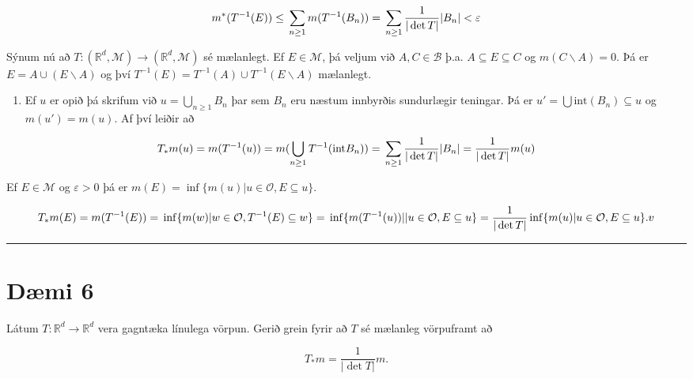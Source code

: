 \documentclass[]{book}
\providecommand{\tightlist}{%
  \setlength{\itemsep}{0pt}\setlength{\parskip}{0pt}}
\begin{document}
\[
m^*(T^{-1}(E)) \leq \\
\sum_{n\geq1} m(T^{-1}(B_n)) = \\
\sum_{n\geq1} \frac{1}{|\det T|}|B_n| < \varepsilon
\]

Sýnum nú að \(T:(\mathbb R^d,\mathcal M)\rightarrow (\mathbb R^d,\mathcal M)\) sé mælanlegt. Ef \(E \in\mathcal M\), þá veljum við \(A,C\in\mathcal B\) þ.a. \(A\subseteq E\subseteq C\) og \(m(C\backslash A) = 0\). Þá er \(E = A \cup (E\backslash A)\) og því \(T^{-1}(E) = T^{-1}(A) \cup T^{-1}(E\backslash A)\) mælanlegt.

\begin{enumerate}
\def\labelenumi{\arabic{enumi}.}
\setcounter{enumi}{3}
\tightlist
\item
  Ef \(u\) er opið þá skrifum við \(u = \bigcup_{n\geq1}B_n\) þar sem \(B_n\) eru næstum innbyrðis sundurlægir teningar. Þá er \(u' = \bigcup \text{int}(B_n) \subseteq u\) og \(m(u') = m(u)\). Af því leiðir að
\end{enumerate}

\[
T_*m(u) = m(T^{-1}(u)) = \\ 
m(\bigcup_{n\geq1} T^{-1}(\text{int} B_n)) = \\
\sum_{n\geq1} \frac{1}{|\det T|}|B_n| = \\
\frac{1}{|\det T|}m(u)
\]

Ef \(E\in \mathcal M\) og \(\varepsilon > 0\) þá er \(m(E) = \inf\{m(u) | u\in\mathcal O, E\subseteq u\}\).

\[
T_*m(E) = m(T^{-1}(E)) = \\
\inf\{m(w) | w\in\mathcal O, T^{-1}(E)\subseteq w\} = \\
\inf\{m(T^{-1}(u)) | | u\in \mathcal O, E\subseteq u\} = \\
\frac{1}{|\det T|}\inf\{m(u) | u\in\mathcal O, E\subseteq u\}.v
\]

\begin{center}\rule{0.5\linewidth}{\linethickness}\end{center}

\hypertarget{dmi-6-5}{%
\section*{Dæmi 6}\label{dmi-6-5}}

Látum \(T:\mathbb R^d\rightarrow\mathbb R^d\) vera gagntæka línulega vörpun. Gerið grein fyrir að \(T\) sé mælanleg vörpuframt að

\[
T_*m = \frac{1}{|\det T|}m.
\]
\end{document}
